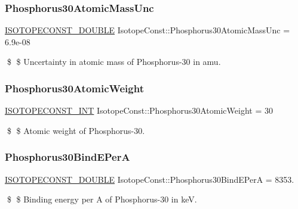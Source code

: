 \subsubsection{\texorpdfstring{Phosphorus30\+Atomic\+Mass\+Unc}{Phosphorus30AtomicMassUnc}}
{\footnotesize\ttfamily \mbox{\hyperlink{group___isotope_const-_macros_ga8f45a7272ce02c0b4c65c44636ed719a}{I\+S\+O\+T\+O\+P\+E\+C\+O\+N\+S\+T\+\_\+\+D\+O\+U\+B\+LE}} Isotope\+Const\+::\+Phosphorus30\+Atomic\+Mass\+Unc = 6.\+9e-\/08}

\$ \$ Uncertainty in atomic mass of Phosphorus-\/30 in amu. \mbox{\label{group___isotope_const-_phosphorus-_p30_ga9409388fd45e99c882b91f9226a5d87a}} 
\subsubsection{\texorpdfstring{Phosphorus30\+Atomic\+Weight}{Phosphorus30AtomicWeight}}
{\footnotesize\ttfamily \mbox{\hyperlink{group___isotope_const-_macros_ga5f18360b3e99483a35c32d789e62621c}{I\+S\+O\+T\+O\+P\+E\+C\+O\+N\+S\+T\+\_\+\+I\+NT}} Isotope\+Const\+::\+Phosphorus30\+Atomic\+Weight = 30}

\$ \$ Atomic weight of Phosphorus-\/30. \mbox{\label{group___isotope_const-_phosphorus-_p30_gad9b1c801cd0add9cb861c56b9068b51c}} 
\subsubsection{\texorpdfstring{Phosphorus30\+Bind\+E\+PerA}{Phosphorus30BindEPerA}}
{\footnotesize\ttfamily \mbox{\hyperlink{group___isotope_const-_macros_ga8f45a7272ce02c0b4c65c44636ed719a}{I\+S\+O\+T\+O\+P\+E\+C\+O\+N\+S\+T\+\_\+\+D\+O\+U\+B\+LE}} Isotope\+Const\+::\+Phosphorus30\+Bind\+E\+PerA = 8353.}

\$ \$ Binding energy per A of Phosphorus-\/30 in keV. \mbox{\label{group___isotope_const-_phosphorus-_p30_ga98fb2770cad1befc0528bb90c8cc9e34}} 
